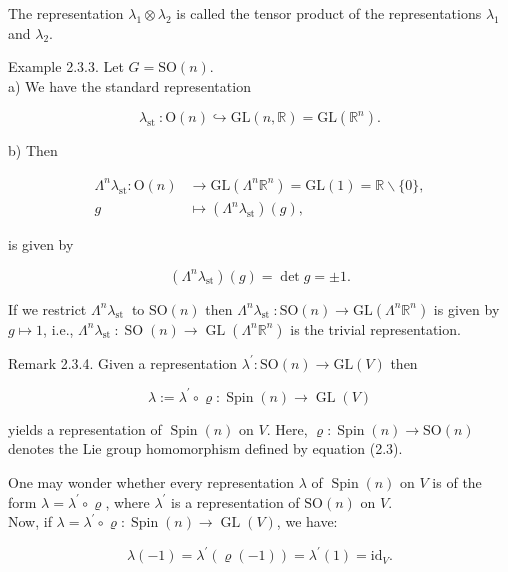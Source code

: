 \documentclass[10pt, letterpaper]{article}
\begin{document}
The representation $\lambda_{1} \otimes \lambda_{2}$ is called the tensor product of the representations $\lambda_{1}$ and $\lambda_{2}$.

Example 2.3.3. Let $G=\mathrm{SO}(n)$.\\
a) We have the standard representation

$$
\lambda_{\text {st }}: \mathrm{O}(n) \hookrightarrow \mathrm{GL}(n, \mathbb{R})=\mathrm{GL}\left(\mathbb{R}^{n}\right) .
$$

b) Then

$$
\begin{aligned}
\Lambda^{n} \lambda_{\mathrm{st}}: \mathrm{O}(n) & \rightarrow \mathrm{GL}\left(\Lambda^{n} \mathbb{R}^{n}\right)=\mathrm{GL}(1)=\mathbb{R} \backslash\{0\}, \\
g & \mapsto\left(\Lambda^{n} \lambda_{\mathrm{st}}\right)(g),
\end{aligned}
$$

is given by

$$
\left(\Lambda^{n} \lambda_{\mathrm{st}}\right)(g)=\operatorname{det} g= \pm 1 .
$$

If we restrict $\Lambda^{n} \lambda_{\text {st }}$ to $\mathrm{SO}(n)$ then $\Lambda^{n} \lambda_{\text {st }}: \mathrm{SO}(n) \rightarrow \mathrm{GL}\left(\Lambda^{n} \mathbb{R}^{n}\right)$ is given by $g \mapsto 1$, i.e., $\Lambda^{n} \lambda_{\text {st }}: \operatorname{SO}(n) \rightarrow \operatorname{GL}\left(\Lambda^{n} \mathbb{R}^{n}\right)$ is the trivial representation.

Remark 2.3.4. Given a representation $\lambda^{\prime}: \mathrm{SO}(n) \rightarrow \mathrm{GL}(V)$ then

$$
\lambda:=\lambda^{\prime} \circ \varrho: \operatorname{Spin}(n) \rightarrow \operatorname{GL}(V)
$$

yields a representation of $\operatorname{Spin}(n)$ on $V$. Here, $\varrho: \operatorname{Spin}(n) \rightarrow \mathrm{SO}(n)$ denotes the Lie group homomorphism defined by equation (2.3).

One may wonder whether every representation $\lambda$ of $\operatorname{Spin}(n)$ on $V$ is of the form $\lambda=\lambda^{\prime} \circ \varrho$, where $\lambda^{\prime}$ is a representation of $\mathrm{SO}(n)$ on $V$.\\
Now, if $\lambda=\lambda^{\prime} \circ \varrho: \operatorname{Spin}(n) \rightarrow \operatorname{GL}(V)$, we have:

$$
\lambda(-1)=\lambda^{\prime}(\varrho(-1))=\lambda^{\prime}(1)=\mathrm{id}_{V} .
$$
\end{document}
